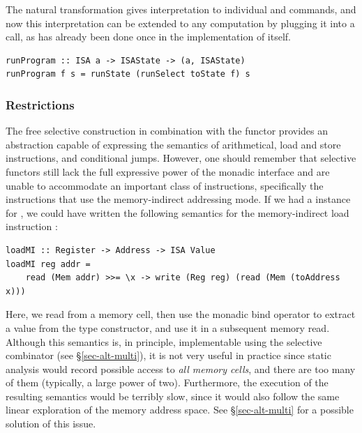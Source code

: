 The natural transformation  gives interpretation to individual
 and  commands, and now this interpretation can be extended
to any  computation by plugging it into a  call, as has
already been done once in the implementation of  itself.

\vspace{1mm}
\begin{verbatim}
runProgram :: ISA a -> ISAState -> (a, ISAState)
runProgram f s = runState (runSelect toState f) s
\end{verbatim}
\vspace{1mm}

\subsubsection{Restrictions}

The free selective construction in combination with the  functor provides
an abstraction capable of expressing the semantics of arithmetical, load and
store instructions, and conditional jumps. However, one should remember that
selective functors still lack the full expressive power of the monadic interface
and are unable to accommodate an important class of instructions, specifically
the instructions that use the memory-indirect addressing mode. If we had a
 instance for , we could have written the following
semantics for the memory-indirect load instruction :

\vspace{1mm}
\begin{verbatim}
loadMI :: Register -> Address -> ISA Value
loadMI reg addr =
    read (Mem addr) >>= \x -> write (Reg reg) (read (Mem (toAddress x)))
\end{verbatim}
\vspace{1mm}

\noindent
Here, we read from a memory cell, then use the monadic bind operator to extract
a value from the  type constructor, and use it in a subsequent memory
read. Although this semantics is, in principle, implementable using the
selective  combinator (see \S\ref{sec-alt-multi}), it is not very
useful in practice since static analysis would record possible access to
\emph{all memory cells}, and there are too many of them (typically, a large
power of two). Furthermore, the execution of the resulting semantics would be
terribly slow, since it would also follow the same linear exploration of the
memory address space. See \S\ref{sec-alt-multi} for a possible solution of this
issue.


